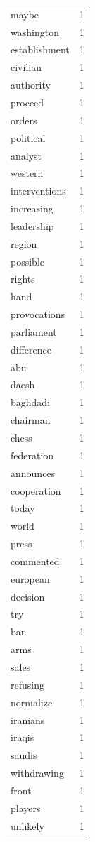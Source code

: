 \begin{tabular}{lr}
maybe & 1 \\
washington & 1 \\
establishment & 1 \\
civilian & 1 \\
authority & 1 \\
proceed & 1 \\
orders & 1 \\
political & 1 \\
analyst & 1 \\
western & 1 \\
interventions & 1 \\
increasing & 1 \\
leadership & 1 \\
region & 1 \\
possible & 1 \\
rights & 1 \\
hand & 1 \\
provocations & 1 \\
parliament & 1 \\
difference & 1 \\
abu & 1 \\
daesh & 1 \\
baghdadi & 1 \\
chairman & 1 \\
chess & 1 \\
federation & 1 \\
announces & 1 \\
cooperation & 1 \\
today & 1 \\
world & 1 \\
press & 1 \\
commented & 1 \\
european & 1 \\
decision & 1 \\
try & 1 \\
ban & 1 \\
arms & 1 \\
sales & 1 \\
refusing & 1 \\
normalize & 1 \\
iranians & 1 \\
iraqis & 1 \\
saudis & 1 \\
withdrawing & 1 \\
front & 1 \\
players & 1 \\
unlikely & 1 \\

\end{tabular}
